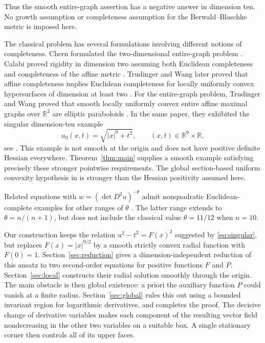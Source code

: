 \documentclass[11pt]{article}
\newcommand{\R}{\mathbb R}
\theoremstyle{remark}
\begin{document}
Thus the smooth entire-graph assertion has a negative answer in
dimension ten.  No growth assumption or completeness assumption for
the Berwald--Blaschke metric is imposed here.

The classical problem has several formulations involving different
notions of completeness.  Chern formulated the two-dimensional
entire-graph problem \cite{Chern1979}.  Calabi proved rigidity in
dimension two assuming both Euclidean completeness and completeness
of the affine metric \cite{Calabi1982}.  Trudinger and Wang later
proved that affine completeness implies Euclidean completeness for
locally uniformly convex hypersurfaces of dimension at least two
\cite{TrudingerWang2002}.
For the entire-graph problem, Trudinger and Wang proved that smooth
locally uniformly convex entire affine maximal graphs over $\R^2$
are elliptic paraboloids \cite{TrudingerWang2000}.  In the same paper,
they exhibited the singular dimension-ten example
\begin{equation}\label{eq:singular}
 u_0(x,t)=\sqrt{|x|^9+t^2},\qquad (x,t)\in\R^9\times\R,
\end{equation}
see \cite[Section~7]{TrudingerWang2000}.  This example is not smooth
at the origin and does not have positive definite Hessian everywhere.
Theorem~\ref{thm:main} supplies a smooth example satisfying precisely
these stronger pointwise requirements.  The global section-based
uniform convexity hypothesis in
\cite[Corollary~4.3]{TrudingerWang2000} is stronger than the Hessian
positivity assumed here.

Related equations with $w=(\det D^2u)^{-\theta}$ admit nonquadratic
Euclidean-complete examples for other ranges of $\theta$
\cite{Du2024,SunXingXu2026}.  The latter range extends to
$\theta=n/(n+1)$, but does not include the classical value
$\theta=11/12$ when $n=10$.

Our construction keeps the relation $u^2-t^2=F(x)^2$ suggested by
\eqref{eq:singular}, but replaces $F(x)=|x|^{9/2}$ by a smooth
strictly convex radial function with $F(0)=1$.
Section~\ref{sec:reduction} gives a dimension-independent reduction
of this ansatz to two second-order equations for positive functions
$F$ and $P$.  Section~\ref{sec:local} constructs their radial solution
smoothly through the origin.  The main obstacle is then global
existence: a priori the auxiliary function $P$ could vanish at a
finite radius.  Section~\ref{sec:global} rules this out using a bounded
invariant region for logarithmic derivatives, and completes the
proof.  The decisive change of derivative variables makes each
component of the resulting vector field nondecreasing in the other
two variables on a suitable box.  A single stationary corner then
controls all of its upper faces.
\end{document}
